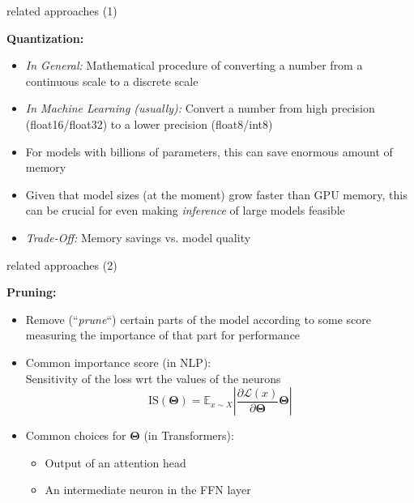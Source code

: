 
\begin{frame}{related approaches (1)}

\vfill

\textbf{Quantization:}

\begin{itemize}
	\item \textit{In General:} Mathematical procedure of converting a number from a continuous scale to a discrete scale
	\item \textit{In Machine Learning (usually):} Convert a number from high precision (float16/float32) to a lower precision (float8/int8) 
	\item For models with billions of parameters, this can save enormous amount of memory
	\item Given that model sizes (at the moment) grow faster than GPU memory, this can be crucial for even making \textit{inference} of large models feasible
	\item \textit{Trade-Off:} Memory savings vs. model quality
\end{itemize}

\vfill
	
\end{frame}


\begin{frame}{related approaches (2)}

\vfill

\textbf{Pruning:}

\begin{itemize}
	\item Remove (``\textit{prune}``) certain parts of the model according to some score measuring the importance of that part for performance 
	\item Common importance score (in NLP):\\Sensitivity of the loss wrt the values of the neurons 
							$$\mathrm{IS}(\bm\Theta) = \mathbb{E}_{x\sim X}\left\lvert \frac{\partial \mathcal{L}(x)}{\partial\bm\Theta}\bm\Theta \right\rvert$$
	\item Common choices for $\bm\Theta$ (in Transformers):
			\begin{itemize}
				\item Output of an attention head
				\item An intermediate neuron in the FFN layer
			\end{itemize}
\end{itemize}

\vfill
	
\end{frame}

